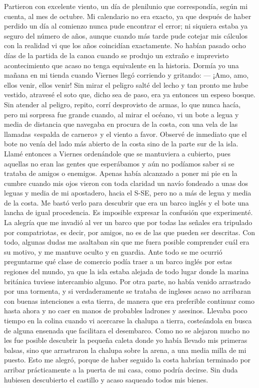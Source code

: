 \documentclass{novela}
\begin{document}
    Partieron con excelente viento, un día de plenilunio que correspondía, según mi cuenta, al mes de octubre. Mi calendario no era exacto, ya que después de haber perdido un día al comienzo nunca pude encontrar el error; ni siquiera estaba ya seguro del número de años, aunque cuando más tarde pude cotejar mis cálculos con la realidad vi que los años coincidían exactamente.
    No habían pasado ocho días de la partida de la canoa cuando se produjo un extraño e imprevisto acontecimiento que acaso no tenga equivalente en la historia. Dormía yo una mañana en mi tienda cuando Viernes llegó corriendo y gritando:
    — ¡Amo, amo, ellos venir, ellos venir!
    Sin mirar el peligro salté del lecho y tan pronto me hube vestido, atravesé el soto que, dicho sea de paso, era ya entonces un espeso bosque. Sin atender al peligro, repito, corrí desprovisto de armas, lo que nunca hacía, pero mi sorpresa fue grande cuando, al mirar el océano, vi un bote a legua y media de distancia que navegaba en procura de la costa, con una vela de las llamadas «espalda de carnero» y el viento a favor. Observé de inmediato que el bote no venía del lado más abierto de la costa sino de la parte sur de la isla.
    Llamé entonces a Viernes ordenándole que se mantuviera a cubierto, pues aquellas no eran las gentes que esperábamos y aún no podíamos saber si se trataba de amigos o enemigos. Apenas había alcanzado a poner mi pie en la cumbre cuando mis ojos vieron con toda claridad un navío fondeado a unas dos leguas y media de mi apostadero, hacia el S-SE, pero no a más de legua y media de la costa. Me bastó verlo para descubrir que era un barco inglés y el bote una lancha de igual procedencia.
    Es imposible expresar la confusión que experimenté. La alegría que me invadió al ver un barco que por todas las señales era tripulado por compatriotas, es decir, por amigos, no es de las que pueden ser descritas. Con todo, algunas dudas me asaltaban sin que me fuera posible comprender cuál era su motivo, y me mantuve oculto y en guardia. Ante todo se me ocurrió preguntarme qué clase de comercio podía traer a un barco inglés por estas regiones del mundo, ya que la isla estaba alejada de todo lugar donde la marina británica tuviese intercambio alguno. Por otra parte, no había venido arrastrado por una tormenta, y si verdaderamente se trataba de ingleses acaso no arribaran con buenas intenciones a esta tierra, de manera que era preferible continuar como hasta ahora y no caer en manos de probables ladrones y asesinos.
    Llevaba poco tiempo en la colina cuando vi acercarse la chalupa a tierra, costeándola en busca de alguna ensenada que facilitara el desembarco. Como no se alejaron mucho no les fue posible descubrir la pequeña caleta donde yo había llevado mis primeras balsas, sino que arrastraron la chalupa sobre la arena, a una media milla de mi puesto. Esto me alegró, porque de haber seguido la costa habrían terminado por arribar prácticamente a la puerta de mi casa, como podría decirse. Sin duda hubiesen descubierto el castillo y acaso saqueado todos mis bienes.
\end{document}

